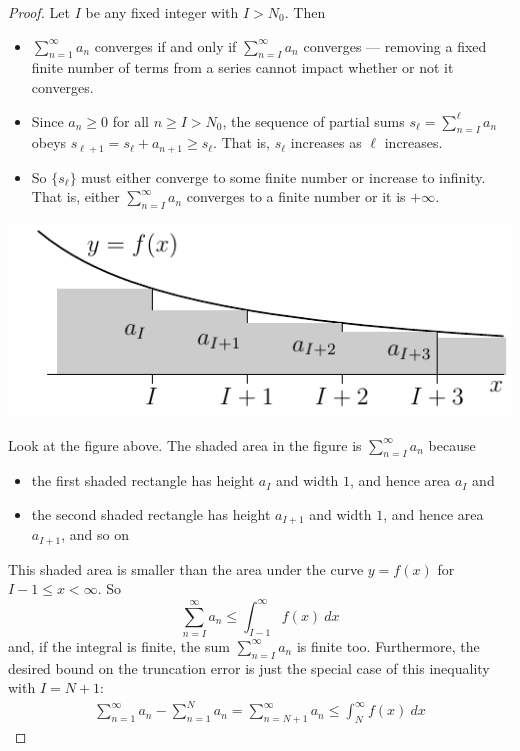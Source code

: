 \begin{proof}
Let $I$ be any fixed integer with $I>N_0$. Then
\begin{itemize}
\item
$\sum_{n=1}^\infty a_n$ converges if and only if
$\sum_{n=I}^\infty a_n$ converges --- removing a fixed finite number
of terms from a series cannot impact whether or not it converges.
\item
Since $a_n\ge 0$ for all $n\ge I>N_0$, the sequence of partial sums
$s_\ell=\sum_{n=I}^\ell a_n$ obeys $s_{\ell+1} = s_\ell+a_{n+1}
\ge s_\ell$. That is, $s_\ell$ increases as $\ell$ increases.
\item
So $\big\{s_\ell\big\}$ must either
converge to some finite number or increase to infinity. That is, either
$\sum_{n=I}^\infty a_n$ converges to a finite number or it is $+\infty$.
\end{itemize}
\begin{efig}
\begin{center}
     \includegraphics{intTest3.pdf}
\end{center}
\end{efig}

Look at the figure above. The shaded area in the figure is
$\sum_{n=I}^\infty a_n$ because
\begin{itemize}\itemsep1pt \parskip0pt  %
\item the first shaded rectangle has height $a_I$
and width $1$, and hence area $a_I$ and
\item the second shaded rectangle has height $a_{I+1}$
and width $1$, and hence area $a_{I+1}$, and so on
\end{itemize}
This shaded area is smaller than the area under the curve $y=f(x)$ for
$I-1\le x<\infty$. So
\begin{equation*}
\sum_{n=I}^\infty a_n
\le \int_{I-1}^\infty f(x)\ dx
\end{equation*}
and, if the integral is finite, the sum $\sum_{n=I}^\infty a_n$ is
finite too.
Furthermore, the desired bound on the truncation error is just
the special case of this inequality with $I=N+1$:
\begin{align*}
\sum_{n=1}^\infty a_n - \sum_{n=1}^N a_n
=\sum_{n=N+1}^\infty a_n
\le \int_N^\infty f(x)\ dx
\end{align*}



\end{proof}
